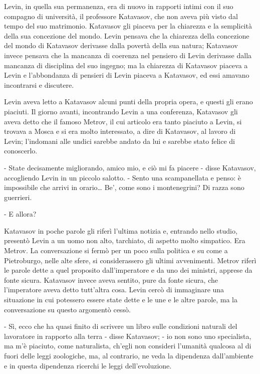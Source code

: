 Levin, in quella sua permanenza, era di nuovo in rapporti intimi con il suo compagno di università, il professore Katavasov, che non aveva più visto dal tempo del suo matrimonio. Katavasov gli piaceva per la chiarezza e la semplicità della sua concezione del mondo. Levin pensava che la chiarezza della concezione del mondo di Katavasov derivasse dalla povertà della sua natura; Katavasov invece pensava che la mancanza di coerenza nel pensiero di Levin derivasse dalla mancanza di disciplina del suo ingegno; ma la chiarezza di Katavasov piaceva a Levin e l'abbondanza di pensieri di Levin piaceva a Katavasov, ed essi amavano incontrarsi e discutere. 

Levin aveva letto a Katavasov alcuni punti della propria opera, e questi gli erano piaciuti. Il giorno avanti, incontrando Levin a una conferenza, Katavasov gli aveva detto che il famoso Metrov, il cui articolo era tanto piaciuto a Levin, si trovava a Mosca e si era molto interessato, a dire di Katavasov, al lavoro di Levin; l'indomani alle undici sarebbe andato da lui e sarebbe stato felice di conoscerlo. 

- State decisamente migliorando, amico mio, e ciò mi fa piacere - disse Katavasov, accogliendo Levin in un piccolo salotto. - Sento una scampanellata e penso: è impossibile che arrivi in orario\ldots{} Be', come sono i montenegrini? Di razza sono guerrieri. 

- E allora? 

Katavasov in poche parole gli riferì l'ultima notizia e, entrando nello studio, presentò Levin a un uomo non alto, tarchiato, di aspetto molto simpatico. Era Metrov. La conversazione si fermò per un poco sulla politica e su come a Pietroburgo, nelle alte sfere, si considerassero gli ultimi avvenimenti. Metrov riferì le parole dette a quel proposito dall'imperatore e da uno dei ministri, apprese da fonte sicura. Katavasov invece aveva sentito, pure da fonte sicura, che l'imperatore aveva detto tutt'altra cosa. Levin cercò di immaginare una situazione in cui potessero essere state dette e le une e le altre parole, ma la conversazione su questo argomentò cessò. 

- Sì, ecco che ha quasi finito di scrivere un libro sulle condizioni naturali del lavoratore in rapporto alla terra - disse Katavasov; - io non sono uno specialista, ma m'è piaciuto, come naturalista, ch'egli non consideri l'umanità qualcosa al di fuori delle leggi zoologiche, ma, al contrario, ne veda la dipendenza dall'ambiente e in questa dipendenza ricerchi le leggi dell'evoluzione. 

